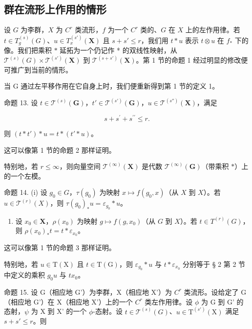 \subsection{群在流形上作用的情形}

设 \(G\) 为李群，\(X\) 为 \(C^r\) 类流形，\(f\) 为一个 \(C^r\) 类的、\(G\) 在 \(X\) 上的左作用律。若 \(t \in T_g^{(s)}(G)\)、\(u \in T_x^{(s')}(\mathbf{X})\) 且 \(s + s' \leqslant r\)，我们用 \(t * u\) 表示 \(t \otimes u\) 在 \(f_*\) 下的像。我们把乘积 \(*\) 延拓为一个仍记作 * 的双线性映射，从 \(\mathcal{T}^{(s)}(G) \times \mathcal{T}^{(s')}(\mathbf{X})\) 到 \(\mathcal{T}^{(s+s')}(\mathbf{X})\)。第 1 节的命题 1 经过明显的修改便可推广到当前的情形。

当 G 通过左平移作用在它自身上时，我们便重新得到第 1 节的定义 1。

命题 13. 设 \(t \in \mathcal{T}^{(s)}(\mathbf{G})\)，\(t' \in \mathcal{T}^{(s')}(\mathbf{G})\)，\(u \in \mathcal{T}^{(s'')}(\mathbf{X})\)，满足

\[
s + s ^ {\prime} + s ^ {\prime \prime} \leqslant r.
\]

则 \((t*t')*u=t*(t'*u)\)。

这可以像第 1 节的命题 2 那样证明。

特别地，若 \(r \leqslant \infty\)，则向量空间 \(\mathcal{T}^{(\infty)}(\mathbf{X})\) 是代数 \(\mathcal{T}^{(\infty)}(\mathbf{G})\)（带乘积 \(*\)）上的一个左模。

命题 14. (i) 设 \(g_0 \in G\)，\(\tau(g_0)\) 为映射 \(x \mapsto f(g_0, x)\)（从 \(X\) 到 \(X\)）。若 \(u \in \mathcal{T}^{(r)}(X)\)，则 \(\tau(g_0)_*u = \varepsilon_{g_0} * u\)。

\begin{enumerate}
\def\labelenumi{(\roman{enumi})}
\setcounter{enumi}{1}
\tightlist
\item
  设 \(x_0 \in \mathbf{X}\)，\(\rho(x_0)\) 为映射 \(g \mapsto f(g, x_0)\)（从 \(G\) 到 \(X\)）。若 \(t \in T^{(r)}(G)\)，则 \(\rho(x_0)_*t = t * \varepsilon_{x_0}\)。
\end{enumerate}

这可以像第 1 节的命题 3 那样证明。

特别地，若 \(u \in \mathrm{T}(\mathrm{X})\) 且 \(t \in \mathrm{T}(\mathrm{G})\)，则 \(\varepsilon_{g_0} * u\) 与 \(t * \varepsilon_{x_0}\) 分别等于 § 2 第 2 节中定义的乘积 \(g_0u\) 与 \(tx_0\)。

命题 15. 设 G（相应地 G'）为李群，X（相应地 X'）为 \(C^{r}\) 类流形。设给定了 G（相应地 G'）在 X（相应地 X'）上的一个 \(C^{r}\) 类左作用律。设 \(\phi\) 为 G 到 G' 的态射，\(\psi\) 为 X 到 X' 的一个 \(\phi\)-态射。设 \(t \in \mathcal{T}^{(s)}(G)\)、\(u \in \mathrm{T}^{(s')}(\mathrm{X})\) 满足 \(s + s' \leqslant r\)。则


